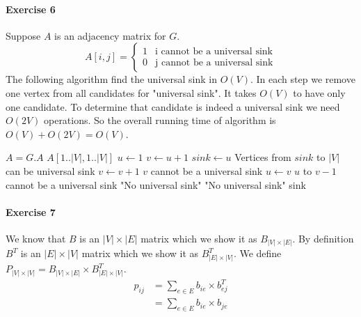 \documentclass{book}
\begin{document}
	\paragraph{Exercise 6}
	Suppose $A$ is an adjacency matrix for $G$.
	\begin{equation*}
		A[i, j] = \begin{cases}
		1 & \text{i cannot be a universal sink} \\
		0 & \text{j cannot be a universal sink}
		\end{cases}
	\end{equation*}
	The following algorithm find the universal sink in $O(V)$. In each step we remove one vertex from all candidates for "universal sink". It takes $O(V)$ to have only one candidate. To determine that candidate is indeed a universal sink we need $O(2V)$ operations. So the overall running time of algorithm is $O(V) + O(2V) = O(V)$.
	\begin{algorithm*}[h!]
		\begin{algorithmic}[1]
				\State $A = G.A$
				\Comment $A[1..|V|, 1..|V|]$
				\State $u \gets 1$								
					\State $v \gets u + 1$
					\State $sink \gets u$
					\Comment Vertices from $sink$ to $|V|$ can be universal sink					
						\State $v \gets v + 1$
						\Comment $v$ cannot be a universal sink
					\EndWhile
					\State $u \gets v$
					\Comment $u$ to $v - 1$ cannot be a universal sink
				\EndWhile
						\State \Return "No universal sink"
					\EndIf
				\EndFor
						\State \Return "No universal sink"
					\EndIf
				\EndFor
				\State \Return sink
			\EndFunction
		\end{algorithmic}
	\end{algorithm*}
	\FloatBarrier
	\paragraph{Exercise 7}
	We know that $B$ is an $|V| \times |E|$ matrix which we show it as $B_{|V| \times |E|}$. By definition $B^T$ is an $|E| \times |V|$ matrix which we show it as $B_{|E| \times |V|}^T$. We define $P_{|V| \times |V|} = B_{|V| \times |E|} \times B_{|E| \times |V|}^T$.
	\begin{equation*}	
	\begin{split}
		p_{ij} &= \sum_{e \in E}b_{ie} \times b^T_{ej} \\
		&= \sum_{e \in E}b_{ie} \times b_{je}
	\end{split}
	\end{equation*}
	
\end{document}
